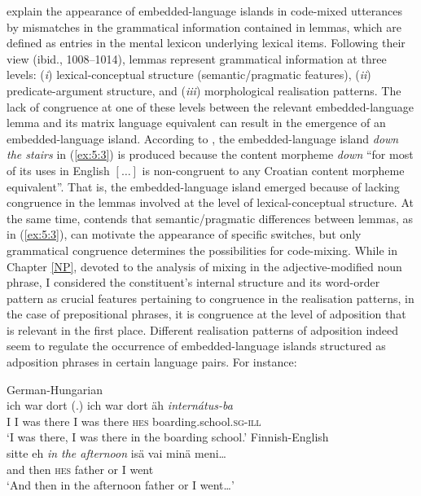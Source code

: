 \noindent \citet{myers-scotton-matching-1995} explain the appearance of embedded-language islands in code-mixed utterances by mismatches in the grammatical information contained in lemmas, which are defined as entries in the mental lexicon underlying lexical items. Following their view (ibid., 1008--1014), lemmas represent grammatical information at three levels: (\textit{i}) lexical-conceptual structure (semantic/pragmatic features), (\textit{ii}) predicate-argument structure, and (\textit{iii}) morphological realisation patterns. The lack of congruence at one of these levels between the relevant embedded-language lemma and its matrix language equivalent can result in the emergence of an embedded-language island. According to \citet[][227]{hlavac-second-generation-2003}, the embedded-language island \textit{down the stairs} in (\ref{ex:5:3}) is produced because the content morpheme \textit{down} ``for most of its uses in English $[\dots{}]$ is non-congruent to any Croatian content morpheme equivalent''. That is, the embedded-language island emerged because of lacking congruence in the lemmas involved at the level of lexical-conceptual structure. At the same time, \citet[258]{deuchar-congruence-2005} contends that semantic/pragmatic differences between lemmas, as in (\ref{ex:5:3}), can motivate the appearance of specific switches, but only grammatical congruence determines the possibilities for code-mixing. While in Chapter \ref{NP}, devoted to the analysis of mixing in the adjective-modified noun phrase, I considered the constituent's internal structure and its word-order pattern as crucial features pertaining to congruence in the realisation patterns, in the case of prepositional phrases, it is congruence at the level of adposition that is relevant in the first place. Different realisation patterns of adposition indeed seem to regulate the occurrence of embedded-language islands structured as adposition phrases in certain language pairs. For instance:

\ea
\label{ex:5:4}
German-Hungarian \citep[435]{szabo-language-2010}\\
 {ich} {war} {dort (.)} {ich} {war} {dort} {äh} \textit{internátus-ba}\\
	{I} I was there I was there \textsc{hes} boarding.school.\textsc{sg-ill}\\
\glt `I was there, I was there in the boarding school.'
\ex
\label{ex:5:5}
Finnish-English \citep[226]{lehtinen-analysis-1966}\\
 {sitte} {eh} \textit{in the afternoon} {isä} {vai} {minä} {meni\dots{}}\\
	{and} then \textsc{hes} {} father or I went\\
\glt `And then in the afternoon father or I went\dots{}'
\z

